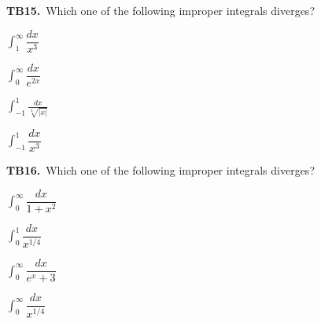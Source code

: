 \documentclass[11pt]{article}
\begin{document}
\bigskip\noindent\textbf{TB15.}\ Which one of the following improper integrals diverges?
\begin{list}{}{\setlength{\leftmargin}{3em}\setlength{\labelwidth}{2.5em}\setlength{\itemsep}{0pt}\setlength{\topsep}{2pt}}
\item[(A)] $\displaystyle\int_1^\infty \dfrac{dx}{x^3}$
\item[(B)] $\displaystyle\int_0^\infty \dfrac{dx}{e^{2x}}$
\item[(C)] $\displaystyle\int_{-1}^1\frac{dx}{\sqrt[4]{|x|}}$
\item[(D)] $\displaystyle\int_{-1}^1 \dfrac{dx}{x^3}$
\end{list}

\bigskip\noindent\textbf{TB16.}\ Which one of the following improper integrals diverges?
\begin{list}{}{\setlength{\leftmargin}{3em}\setlength{\labelwidth}{2.5em}\setlength{\itemsep}{0pt}\setlength{\topsep}{2pt}}
\item[(A)] $\displaystyle\int_0^\infty \dfrac{dx}{1+x^2}$
\item[(B)] $\displaystyle\int_0^1 \dfrac{dx}{x^{1/4}}$
\item[(C)] $\displaystyle\int_0^\infty \dfrac{dx}{e^x+3}$
\item[(D)] $\displaystyle\int_0^\infty \dfrac{dx}{x^{1/4}}$
\end{list}
\end{document}
